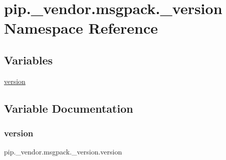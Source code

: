 \hypertarget{namespacepip_1_1__vendor_1_1msgpack_1_1__version}{}\section{pip.\+\_\+vendor.\+msgpack.\+\_\+version Namespace Reference}
\label{namespacepip_1_1__vendor_1_1msgpack_1_1__version}
\subsection*{Variables}
\begin{DoxyCompactItemize}
\item 
\hyperlink{namespacepip_1_1__vendor_1_1msgpack_1_1__version_a2a2f9b95871ba32b4f90a95c918c4090}{version}
\end{DoxyCompactItemize}


\subsection{Variable Documentation}
\mbox{\label{namespacepip_1_1__vendor_1_1msgpack_1_1__version_a2a2f9b95871ba32b4f90a95c918c4090}} 
\subsubsection{\texorpdfstring{version}{version}}
{\footnotesize\ttfamily pip.\+\_\+vendor.\+msgpack.\+\_\+version.\+version}

